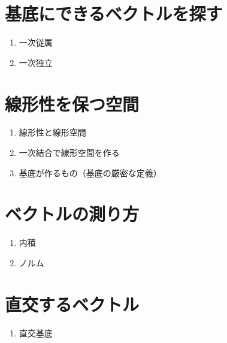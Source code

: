 \documentclass[../imaging-math]{subfiles}
\begin{document}
\section{基底にできるベクトルを探す}

\begin{mindflow}
  \begin{enumerate}
    \item 一次従属
    \item 一次独立
  \end{enumerate}
\end{mindflow}

\section{線形性を保つ空間}

\begin{mindflow}
  \begin{enumerate}
    \item 線形性と線形空間
    \item 一次結合で線形空間を作る
    \item 基底が作るもの（基底の厳密な定義）
  \end{enumerate}
\end{mindflow}

\section{ベクトルの測り方}

\begin{mindflow}
  \begin{enumerate}
    \item 内積
    \item ノルム
  \end{enumerate}
\end{mindflow}

\section{直交するベクトル}

\begin{mindflow}
  \begin{enumerate}
    \item 直交基底
  \end{enumerate}
\end{mindflow}
\end{document}
